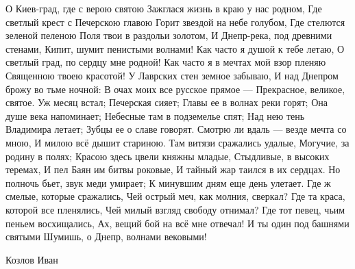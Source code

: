  
 
 
 
 

О Киев-град, где с верою святою
Зажглася жизнь в краю у нас родном,
Где светлый крест с Печерскою главою
Горит звездой на небе голубом,
Где стелются зеленой пеленою
Поля твои в раздольи золотом,
И Днепр-река, под древними стенами,
Кипит, шумит пенистыми волнами!
Как часто я душой к тебе летаю,
О светлый град, по сердцу мне родной!
Как часто я в мечтах мой взор пленяю
Священною твоею красотой!
У Лаврских стен земное забываю,
И над Днепром брожу во тьме ночной:
В очах моих все русское прямое —
Прекрасное, великое, святое.
Уж месяц встал; Печерская сияет;
Главы ее в волнах реки горят;
Она душе века напоминает;
Небесные там в подземелье спят;
Над нею тень Владимира летает;
Зубцы ее о славе говорят.
Смотрю ли вдаль — везде мечта со мною,
И милою всё дышит стариною.
Там витязи сражались удалые,
Могучие, за родину в полях;
Красою здесь цвели княжны младые,
Стыдливые, в высоких теремах,
И пел Баян им битвы роковые,
И тайный жар таился в их сердцах.
Но полночь бьет, звук меди умирает;
К минувшим дням еще день улетает.
Где ж смелые, которые сражались,
Чей острый меч, как молния, сверкал?
Где та краса, которой все пленялись,
Чей милый взгляд свободу отнимал?
Где тот певец, чьим пеньем восхищались,
Ах, вещий бой на всё мне отвечал!
И ты один под башнями святыми
Шумишь, о Днепр, волнами вековыми!

Козлов Иван



